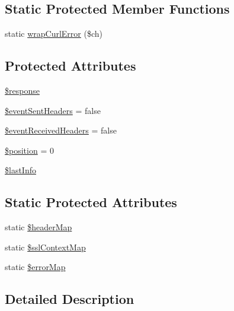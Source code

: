 \subsection*{Static Protected Member Functions}
\begin{DoxyCompactItemize}
\item 
static \hyperlink{classHTTP__Request2__Adapter__Curl_a1ac224c8ce10176a51e756419fc0e374}{wrap\+Curl\+Error} (\$ch)
\end{DoxyCompactItemize}
\subsection*{Protected Attributes}
\begin{DoxyCompactItemize}
\item 
\hyperlink{classHTTP__Request2__Adapter__Curl_a4f2bb3a6dcac6b24cfcf36846921344c}{\$response}
\item 
\hyperlink{classHTTP__Request2__Adapter__Curl_a7676f5068e7106d115b77107ac9b1531}{\$event\+Sent\+Headers} = false
\item 
\hyperlink{classHTTP__Request2__Adapter__Curl_adfd911404ba9642b18156c7e75c1574f}{\$event\+Received\+Headers} = false
\item 
\hyperlink{classHTTP__Request2__Adapter__Curl_aa5d6a073e443ba06f4947ea1ab27643d}{\$position} = 0
\item 
\hyperlink{classHTTP__Request2__Adapter__Curl_afe416c840406d6cf510e0c1cb73afdea}{\$last\+Info}
\end{DoxyCompactItemize}
\subsection*{Static Protected Attributes}
\begin{DoxyCompactItemize}
\item 
static \hyperlink{classHTTP__Request2__Adapter__Curl_a8878ed5fddb43b91450e9359f172838a}{\$header\+Map}
\item 
static \hyperlink{classHTTP__Request2__Adapter__Curl_add699383580a9aea455b7317d07bd5e5}{\$ssl\+Context\+Map}
\item 
static \hyperlink{classHTTP__Request2__Adapter__Curl_a00d7fddefc8d545b63dec0955bd99ae1}{\$error\+Map}
\end{DoxyCompactItemize}


\subsection{Detailed Description}


